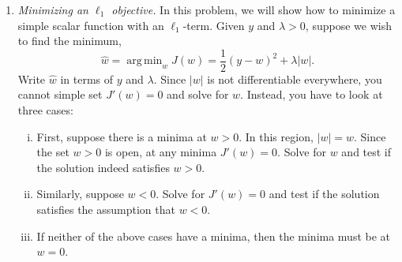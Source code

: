\documentclass[11pt]{article}
\def\argmin{\mathop{\mathrm{arg\,min}}}
\begin{document}
\begin{enumerate}
\item \emph{Minimizing an $\ell_1$ objective.} 
In this problem, we will show how to minimize a simple scalar function with
an $\ell_1$-term.  Given $y$ and $\lambda > 0$, suppose we wish to find the minimum,
\[
    \widehat{w} = \argmin_w J(w) = \frac{1}{2}(y-w)^2 + \lambda|w|.
\]
Write $\widehat{w}$ in terms of $y$ and $\lambda$.  Since $|w|$ is not
differentiable everywhere, you cannot simple set $J'(w)=0$ and solve for $w$.
Instead, you have to look at three cases:
\begin{enumerate}[(i)]
  \item First, suppose there is a minima at $w > 0$.  In this region, $|w| = w$.
  Since the set $w > 0$ is open, at any minima $J'(w)=0$. Solve for $w$ and
  test if the solution indeed satisfies $w > 0$.
  \item Similarly, suppose $w < 0$. Solve for $J'(w) = 0$ and test if the solution
  satisfies the assumption that $w < 0$.
  \item If neither of the above cases have a minima, then the minima must be at
  $w=0$.
\end{enumerate}


\end{enumerate}
\end{document}
